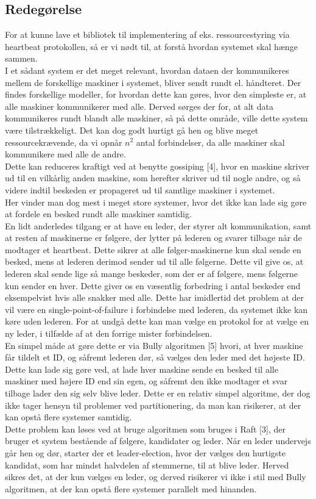 \documentclass[a4paper,12pt]{article}
\begin{document}
\subsection{Redegørelse}
For at kunne lave et bibliotek til implementering af eks. ressourcestyring via heartbeat protokollen, så er vi nødt til, at forstå hvordan systemet skal hænge sammen.
\\
I et sådant system er det meget relevant, hvordan dataen der kommunikeres mellem de forskellige maskiner i systemet, bliver sendt rundt el. håndteret.
Der findes forskellige modeller, for hvordan dette kan gøres, hvor den simpleste er, at alle maskiner kommunikerer med alle.
Derved sørges der for, at alt data kommunikeres rundt blandt alle maskiner, så på dette område, ville dette system være tilstrækkeligt. 
Det kan dog godt hurtigt gå hen og blive meget ressourcekrævende, da vi opnår $n^2$ antal forbindelser, da alle maskiner skal kommunikere med alle de andre.
\\[5px]
Dette kan reduceres kraftigt ved at benytte gossiping [4], hvor en maskine skriver ud til en vilkårlig anden maskine, som herefter skriver ud til nogle andre, og så videre indtil beskeden er propageret ud til samtlige maskiner i systemet.
\\
Her vinder man dog mest i meget store systemer, hvor det ikke kan lade sig gøre at fordele en besked rundt alle maskiner samtidig.
\\[5px]
En lidt anderledes tilgang er at have en leder, der styrer alt kommunikation, samt at resten af maskinerne er følgere, der lytter på lederen og svarer tilbage når de modtager et heartbeat. Dette sikrer at alle følger-maskinerne kun skal sende en besked, mens at lederen derimod sender ud til alle følgerne. Dette vil give os, at lederen skal sende lige så mange beskeder, som der er af følgere, mens følgerne kun sender en hver. 
Dette giver os en væsentlig forbedring i antal beskeder end eksempelvist hvis alle snakker med alle. Dette har imidlertid det problem at der vil være en single-point-of-failure i forbindelse med lederen, da systemet ikke kan køre uden lederen. For at undgå dette kan man vælge en protokol for at vælge en ny leder, i tilfælde af at den forrige mister forbindelsen. 
\\[5px]
En simpel måde at gøre dette er via Bully algoritmen [5] hvori, at hver maskine får tildelt et ID, og såfremt lederen dør, så vælges den leder med det højeste ID. Dette kan lade sig gøre ved, at lade hver maskine sende en besked til alle maskiner med højere ID end sin egen, og såfremt den ikke modtager et svar tilbage lader den sig selv blive leder. Dette er en relativ simpel algoritme, der dog ikke tager hensyn til problemer ved partitionering, da man kan risikerer, at der kan opstå flere systemer samtidig. 
\\[5px]
Dette problem kan løses ved at bruge algoritmen som bruges i Raft [3], der bruger et system bestående af følgere, kandidater og leder.
Når en leder undervejs går hen og dør, starter der et leader-election, hvor der vælges den hurtigste kandidat, som har mindst halvdelen af stemmerne, til at blive leder. Herved sikres det, at der kun vælges en leder, og derved risikerer vi ikke i stil med Bully algoritmen, at der kan opstå flere systemer parallelt med hinanden.
\newpage
  
\end{document}
